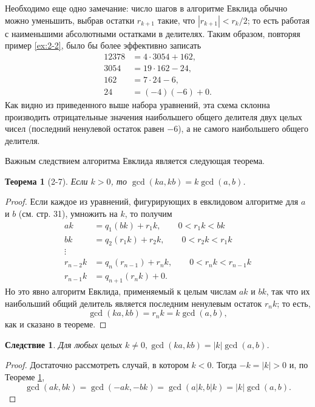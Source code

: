 \documentclass[11pt]{article}
\newtheorem{theorem}{Теорема}
\newtheorem{corollary}{Следствие}
\begin{document}
Необходимо еще одно замечание: число шагов в алгоритме Евклида обычно можно уменьшить, выбрав остатки $r_{k+1}$ такие, что $| r_{k+1}| < r_k / 2$; то есть работая с наименьшими абсолютными остатками в делителях. Таким образом, повторяя пример \ref{ex:2-2}, было бы более эффективно записать
\[
\begin{split}
	12378 & = 4 \cdot 3054 + 162,\\
	3054 & = 19 \cdot 162 - 24,\\
	162 & = 7 \cdot 24 - 6, \\
	24 & = (-4)(-6) + 0.
\end{split}
\]
Как видно из приведенного выше набора уравнений, эта схема склонна производить отрицательные значения наибольшего общего делителя двух целых чисел (последний ненулевой остаток равен $-6$), а не самого наибольшего общего делителя.

Важным следствием алгоритма Евклида является следующая теорема.

\begin{theorem}[2-7]
	Если  $k > 0$, то $\gcd (ka, kb) = k \gcd (a, b)$.
	\label{theorem2-7}
\end{theorem}

\begin{proof}
	Если каждое из уравнений, фигурирующих в евклидовом алгоритме для $a$ и $b$ (см. стр. 31), умножить на $k$, то получим
	\[
	\begin{split}
		ak & = q_1 (bk) + r_1 k, \qquad 0 < r_1 k < bk\\
		bk & = q_2 (r_1 k) + r_2 k, \qquad 0 < r_2 k < r_1 k\\
		\vdots&\\
		r_{n-2} k & = q_n (r_{n-1}) + r_n k, \qquad 0 < r_n k < r_{n-1}k\\
		r_{n-1} k & = q_{n+1}(r_n k) + 0.
	\end{split}
	\]
	Но это явно алгоритм Евклида, применяемый к целым числам $ak$ и $bk$, так что их наибольший общий делитель является последним ненулевым
	остаток $r_n k$; то есть,
	\[\gcd(ka, kb) = r_n k = k \gcd (a, b),\]
	как и сказано в теореме.
\end{proof}

\begin{corollary}
	Для любых целых $k \neq 0, \gcd (ka, kb) = |k|\gcd(a, b)$.
\end{corollary}

\begin{proof}
	Достаточно рассмотреть случай, в котором $k < 0$. Тогда
	$-k = |k| > 0$ и, по Теореме \ref{theorem2-7},
	\[\gcd(ak, bk) = \gcd(-ak, -bk) = \gcd(a|k, b|k) = |k|\gcd(a, b).\]
\end{proof}
\end{document}
